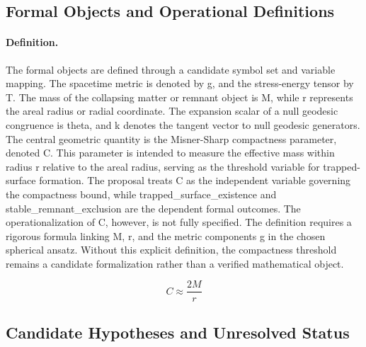 \documentclass[conference]{IEEEtran}
\begin{document}
\subsection{Formal Objects and Operational Definitions}
\paragraph{Definition.} The formal objects are defined through a candidate symbol set and variable mapping. The spacetime metric is denoted by g, and the stress-energy tensor by T. The mass of the collapsing matter or remnant object is M, while r represents the areal radius or radial coordinate. The expansion scalar of a null geodesic congruence is theta, and k denotes the tangent vector to null geodesic generators. The central geometric quantity is the Misner-Sharp compactness parameter, denoted C. This parameter is intended to measure the effective mass within radius r relative to the areal radius, serving as the threshold variable for trapped-surface formation. The proposal treats C as the independent variable governing the compactness bound, while trapped\_surface\_existence and stable\_remnant\_exclusion are the dependent formal outcomes. The operationalization of C, however, is not fully specified. The definition requires a rigorous formula linking M, r, and the metric components g in the chosen spherical ansatz. Without this explicit definition, the compactness threshold remains a candidate formalization rather than a verified mathematical object.

\[
C \approx \frac{2 M}{r}
\]

\subsection{Candidate Hypotheses and Unresolved Status}
\end{document}
